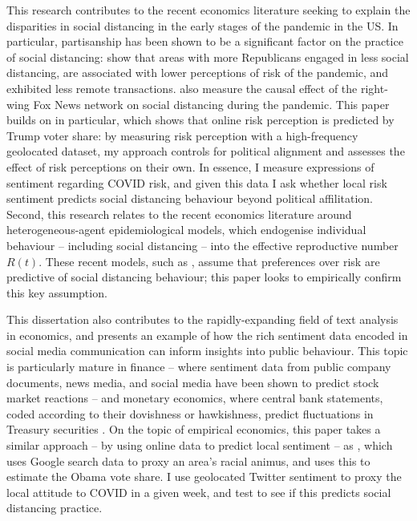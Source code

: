 \documentclass{article}
\begin{document}
This research contributes to the recent economics literature seeking to explain the disparities in social distancing in the early stages of the pandemic in the US. In particular, partisanship has been shown to be a significant factor on the practice of social distancing: \textcite{allcottPolarizationPublicHealth2020,barriosRiskPerceptionLens2020,painterPoliticalBeliefsAffect2020} show that areas with more Republicans engaged in less social distancing, are associated with lower perceptions of risk of the pandemic, and exhibited less remote transactions. \textcite{simonovPersuasiveEffectFox2020,ananyevSafestTimeFly2020} also measure the causal effect of the right-wing Fox News network on social distancing during the pandemic. This paper builds on \textcite{barriosRiskPerceptionLens2020} in particular, which shows that online risk perception is predicted by Trump voter share: by measuring risk perception with a high-frequency geolocated dataset, my approach controls for political alignment and assesses the effect of risk perceptions on their own. In essence, I measure expressions of sentiment regarding COVID risk, and given this data I ask whether local risk sentiment predicts social distancing behaviour beyond political affilitation. Second, this research relates to the recent economics literature around heterogeneous-agent epidemiological models, which endogenise individual behaviour -- including social distancing -- into the effective reproductive number \(R(t)\). These recent models, such as \textcite{acemogluTestingVoluntarySocial2020,brotherhoodEconomicModelCOVID192020,eichenbaumMacroeconomicsEpidemics2020}, assume that preferences over risk are predictive of social distancing behaviour; this paper looks to empirically confirm this key assumption.


This dissertation also contributes to the rapidly-expanding field of text analysis in economics, and presents an example of how the rich sentiment data encoded in social media communication can inform insights into public behaviour. This topic is particularly mature in finance -- where sentiment data from public company documents, news media, and social media have been shown to predict stock market reactions \parencite{bollenTwitterMoodPredicts2011} -- and monetary economics, where central bank statements, coded according to their dovishness or hawkishness, predict fluctuations in Treasury securities \parencite{luccaMeasuringCentralBank2009,gentzkowTextData2019}. On the topic of empirical economics, this paper takes a similar approach -- by using online data to predict local sentiment -- as \textcite{stephens-davidowitzCostRacialAnimus2014}, which uses Google search data to proxy an area's racial animus, and uses this to estimate the Obama vote share. I use geolocated Twitter sentiment to proxy the local attitude to COVID in a given week, and test to see if this predicts social distancing practice. 
\end{document}
